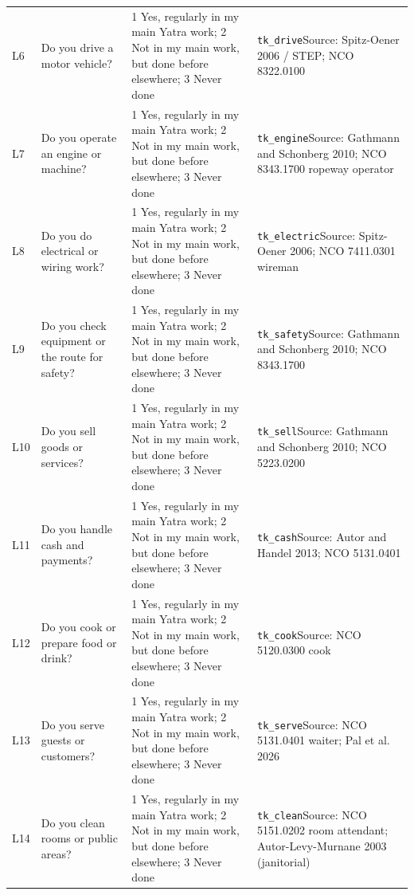 \documentclass[10pt]{article}
\begin{document}
{\begin{longtable}{p{0.8cm}p{6.4cm}p{3.6cm}p{5.8cm}}
L6 & Do you drive a motor vehicle?  & 1 Yes, regularly in my main Yatra work; 2 Not in my main work, but done before elsewhere; 3 Never done & \texttt{tk\_drive}\newline Source: Spitz-Oener 2006 / STEP; NCO 8322.0100 \\
L7 & Do you operate an engine or machine?  & 1 Yes, regularly in my main Yatra work; 2 Not in my main work, but done before elsewhere; 3 Never done & \texttt{tk\_engine}\newline Source: Gathmann and Schonberg 2010; NCO 8343.1700 ropeway operator \\
L8 & Do you do electrical or wiring work?  & 1 Yes, regularly in my main Yatra work; 2 Not in my main work, but done before elsewhere; 3 Never done & \texttt{tk\_electric}\newline Source: Spitz-Oener 2006; NCO 7411.0301 wireman \\
L9 & Do you check equipment or the route for safety?  & 1 Yes, regularly in my main Yatra work; 2 Not in my main work, but done before elsewhere; 3 Never done & \texttt{tk\_safety}\newline Source: Gathmann and Schonberg 2010; NCO 8343.1700 \\
L10 & Do you sell goods or services?  & 1 Yes, regularly in my main Yatra work; 2 Not in my main work, but done before elsewhere; 3 Never done & \texttt{tk\_sell}\newline Source: Gathmann and Schonberg 2010; NCO 5223.0200 \\
L11 & Do you handle cash and payments?  & 1 Yes, regularly in my main Yatra work; 2 Not in my main work, but done before elsewhere; 3 Never done & \texttt{tk\_cash}\newline Source: Autor and Handel 2013; NCO 5131.0401 \\
L12 & Do you cook or prepare food or drink?  & 1 Yes, regularly in my main Yatra work; 2 Not in my main work, but done before elsewhere; 3 Never done & \texttt{tk\_cook}\newline Source: NCO 5120.0300 cook \\
L13 & Do you serve guests or customers?  & 1 Yes, regularly in my main Yatra work; 2 Not in my main work, but done before elsewhere; 3 Never done & \texttt{tk\_serve}\newline Source: NCO 5131.0401 waiter; Pal et al. 2026 \\
L14 & Do you clean rooms or public areas?  & 1 Yes, regularly in my main Yatra work; 2 Not in my main work, but done before elsewhere; 3 Never done & \texttt{tk\_clean}\newline Source: NCO 5151.0202 room attendant; Autor-Levy-Murnane 2003 (janitorial) \\

\end{longtable}}
\end{document}
